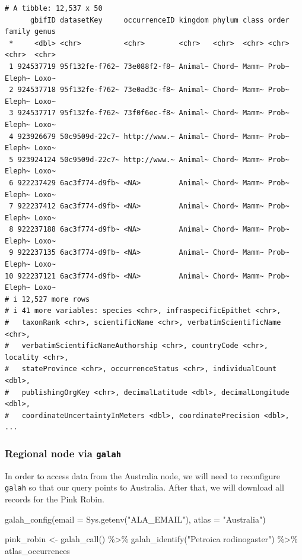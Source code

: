 \documentclass[
  letterpaper,
  DIV=11,
  numbers=noendperiod,
  oneside]{scrreprt}
\newenvironment{Shaded}{\begin{snugshade}}{\end{snugshade}}
\newcommand{\AttributeTok}[1]{\textcolor[rgb]{0.40,0.45,0.13}{#1}}
\newcommand{\FunctionTok}[1]{\textcolor[rgb]{0.28,0.35,0.67}{#1}}
\newcommand{\NormalTok}[1]{\textcolor[rgb]{0.00,0.23,0.31}{#1}}
\newcommand{\OtherTok}[1]{\textcolor[rgb]{0.00,0.23,0.31}{#1}}
\newcommand{\SpecialCharTok}[1]{\textcolor[rgb]{0.37,0.37,0.37}{#1}}
\newcommand{\StringTok}[1]{\textcolor[rgb]{0.13,0.47,0.30}{#1}}
\begin{document}
\begin{verbatim}
# A tibble: 12,537 x 50
      gbifID datasetKey     occurrenceID kingdom phylum class order family genus
 *     <dbl> <chr>          <chr>        <chr>   <chr>  <chr> <chr> <chr>  <chr>
 1 924537719 95f132fe-f762~ 73e088f2-f8~ Animal~ Chord~ Mamm~ Prob~ Eleph~ Loxo~
 2 924537718 95f132fe-f762~ 73e0ad3c-f8~ Animal~ Chord~ Mamm~ Prob~ Eleph~ Loxo~
 3 924537717 95f132fe-f762~ 73f0f6ec-f8~ Animal~ Chord~ Mamm~ Prob~ Eleph~ Loxo~
 4 923926679 50c9509d-22c7~ http://www.~ Animal~ Chord~ Mamm~ Prob~ Eleph~ Loxo~
 5 923924124 50c9509d-22c7~ http://www.~ Animal~ Chord~ Mamm~ Prob~ Eleph~ Loxo~
 6 922237429 6ac3f774-d9fb~ <NA>         Animal~ Chord~ Mamm~ Prob~ Eleph~ Loxo~
 7 922237412 6ac3f774-d9fb~ <NA>         Animal~ Chord~ Mamm~ Prob~ Eleph~ Loxo~
 8 922237188 6ac3f774-d9fb~ <NA>         Animal~ Chord~ Mamm~ Prob~ Eleph~ Loxo~
 9 922237135 6ac3f774-d9fb~ <NA>         Animal~ Chord~ Mamm~ Prob~ Eleph~ Loxo~
10 922237121 6ac3f774-d9fb~ <NA>         Animal~ Chord~ Mamm~ Prob~ Eleph~ Loxo~
# i 12,527 more rows
# i 41 more variables: species <chr>, infraspecificEpithet <chr>,
#   taxonRank <chr>, scientificName <chr>, verbatimScientificName <chr>,
#   verbatimScientificNameAuthorship <chr>, countryCode <chr>, locality <chr>,
#   stateProvince <chr>, occurrenceStatus <chr>, individualCount <dbl>,
#   publishingOrgKey <chr>, decimalLatitude <dbl>, decimalLongitude <dbl>,
#   coordinateUncertaintyInMeters <dbl>, coordinatePrecision <dbl>, ...
\end{verbatim}

\hypertarget{regional-node-via-galah}{%
\subsubsection{\texorpdfstring{Regional node via
\texttt{galah}}{Regional node via galah}}\label{regional-node-via-galah}}

In order to access data from the Australia node, we will need to
reconfigure \texttt{galah} so that our query points to Australia. After
that, we will download all records for the Pink Robin.

\begin{Shaded}
\begin{Highlighting}[]
\FunctionTok{galah\_config}\NormalTok{(}\AttributeTok{email =} \FunctionTok{Sys.getenv}\NormalTok{(}\StringTok{"ALA\_EMAIL"}\NormalTok{), }
             \AttributeTok{atlas =} \StringTok{"Australia"}\NormalTok{)}

\NormalTok{pink\_robin }\OtherTok{\textless{}{-}} \FunctionTok{galah\_call}\NormalTok{() }\SpecialCharTok{\%\textgreater{}\%} 
  \FunctionTok{galah\_identify}\NormalTok{(}\StringTok{"Petroica rodinogaster"}\NormalTok{) }\SpecialCharTok{\%\textgreater{}\%} 
\NormalTok{  atlas\_occurrences}
\end{Highlighting}
\end{Shaded}
\end{document}
